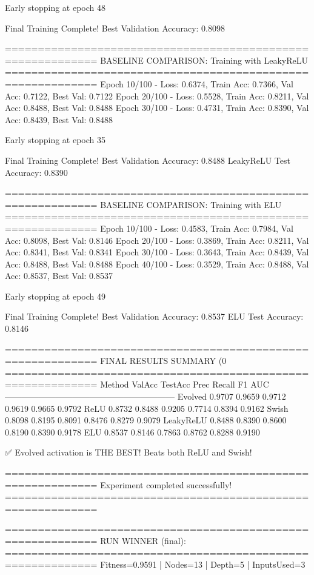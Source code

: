 Early stopping at epoch 48

Final Training Complete!
Best Validation Accuracy: 0.8098

============================================================
BASELINE COMPARISON: Training with LeakyReLU
============================================================
Epoch  10/100 - Loss: 0.6374, Train Acc: 0.7366, Val Acc: 0.7122, Best Val: 0.7122
Epoch  20/100 - Loss: 0.5528, Train Acc: 0.8211, Val Acc: 0.8488, Best Val: 0.8488
Epoch  30/100 - Loss: 0.4731, Train Acc: 0.8390, Val Acc: 0.8439, Best Val: 0.8488

Early stopping at epoch 35

Final Training Complete!
Best Validation Accuracy: 0.8488
LeakyReLU Test Accuracy: 0.8390

============================================================
BASELINE COMPARISON: Training with ELU
============================================================
Epoch  10/100 - Loss: 0.4583, Train Acc: 0.7984, Val Acc: 0.8098, Best Val: 0.8146
Epoch  20/100 - Loss: 0.3869, Train Acc: 0.8211, Val Acc: 0.8341, Best Val: 0.8341
Epoch  30/100 - Loss: 0.3643, Train Acc: 0.8439, Val Acc: 0.8488, Best Val: 0.8488
Epoch  40/100 - Loss: 0.3529, Train Acc: 0.8488, Val Acc: 0.8537, Best Val: 0.8537

Early stopping at epoch 49

Final Training Complete!
Best Validation Accuracy: 0.8537
ELU Test Accuracy: 0.8146

============================================================
FINAL RESULTS SUMMARY (0%
============================================================
Method             ValAcc     TestAcc    Prec       Recall     F1         AUC
------------------------------------------------------------
Evolved            0.9707     0.9659     0.9712     0.9619     0.9665     0.9792
ReLU               0.8732     0.8488     0.9205     0.7714     0.8394     0.9162
Swish              0.8098     0.8195     0.8091     0.8476     0.8279     0.9079
LeakyReLU          0.8488     0.8390     0.8600     0.8190     0.8390     0.9178
ELU                0.8537     0.8146     0.7863     0.8762     0.8288     0.9190

✅ Evolved activation is THE BEST! Beats both ReLU and Swish!

============================================================
Experiment completed successfully!
============================================================

============================================================
RUN WINNER (final):
============================================================
Fitness=0.9591 | Nodes=13 | Depth=5 | InputsUsed=3

